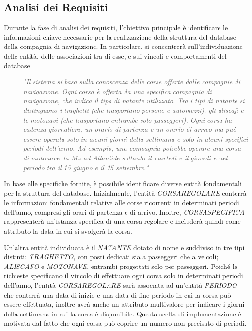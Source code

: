 \subsection{Analisi dei Requisiti}
Durante la fase di analisi dei requisiti, l'obiettivo principale è identificare le informazioni chiave necessarie per la realizzazione della struttura del database della compagnia di navigazione. In particolare, si concentrerà sull'individuazione delle entità, delle associazioni tra di esse, e sui vincoli e comportamenti del database.

\begin{quote}
    \textit{"Il sistema si basa sulla conoscenza delle corse offerte dalle compagnie di navigazione. Ogni corsa è offerta da una specifica compagnia di navigazione, che indica il tipo di natante utilizzato. Tra i tipi di natante si distinguono i traghetti (che trasportano persone e automezzi), gli aliscafi e le motonavi (che trasportano entrambe solo passeggeri). Ogni corsa ha cadenza giornaliera, un orario di partenza e un orario di arrivo ma può essere operata solo in alcuni giorni della settimana e solo in alcuni specifici periodi dell’anno. Ad esempio, una compagnia potrebbe operare una corsa di motonave da Mu ad Atlantide soltanto il martedì e il giovedì e nel periodo tra il 15 giugno e il 15 settembre."}
\end{quote}

In base alle specifiche fornite, è possibile identificare diverse entità fondamentali per la struttura del database. Inizialmente, l'entità \textit{CORSAREGOLARE} conterrà le informazioni fondamentali relative alle corse ricorrenti in determinati periodi dell'anno, compresi gli orari di partenza e di arrivo. Inoltre, \textit{CORSASPECIFICA} rappresenterà un'istanza specifica di una corsa regolare e includerà quindi come attributo la data in cui si svolgerà la corsa.

Un'altra entità individuata è il \textit{NATANTE} dotato di nome e suddiviso in tre tipi distinti: \textit{TRAGHETTO}, con posti dedicati sia a passeggeri che a veicoli; \textit{ALISCAFO} e \textit{MOTONAVE}, entrambi progettati solo per passeggeri. Poiché le richieste specificano il vincolo di effettuare ogni corsa solo in determinati periodi dell'anno, l'entità \textit{CORSAREGOLARE} sarà associata ad un'entità \textit{PERIODO} che conterrà una data di inizio e una data di fine periodo in cui la corsa può essere effettuata, inoltre avrà anche un attributo multivalore per indicare i giorni della settimana in cui la corsa è disponibile. Questa scelta di implementazione è motivata dal fatto che ogni corsa può coprire un numero non precisato di periodi.

